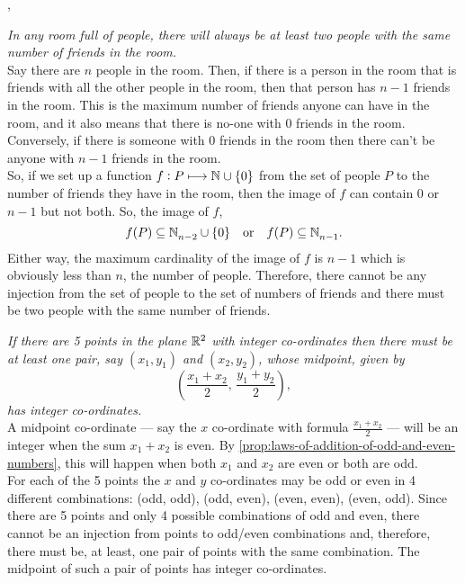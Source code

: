 \documentclass[../MathsNotesBase.tex]{subfiles}
\begin{document}
{		
		
		\sep
		\begin{exe}
			\ex \textit{In any room full of people, there will always be at least two people with the same number of friends in the room.}\\
			
			Say there are $n$ people in the room. Then, if there is a person in the room that is friends with all the other people in the room, then that person has ${ n - 1 }$ friends in the room. This is the maximum number of friends anyone can have in the room, and it also means that there is no-one with 0 friends in the room. Conversely, if there is someone with 0 friends in the room then there can't be anyone with ${ n - 1 }$ friends in the room.\\
			So, if we set up a function ${ f: P \longmapsto \mathbb{N}^{} \cup \{0\} }$ from the set of people $P$ to the number of friends they have in the room, then the image of $f$ can contain 0 or $n-1$ but not both. So, the image of $f$,
			\[ f(P) \subseteq \mathbb{N}^{}_{n-2} \cup \{0\} \hspace{10pt}\text{or}\hspace{10pt} f(P) \subseteq \mathbb{N}^{}_{n-1}. \]
			Either way, the maximum cardinality of the image of $f$ is ${ n - 1 }$ which is obviously less than $n$, the number of people. Therefore, there cannot be any injection from the set of people to the set of numbers of friends and there must be two people with the same number of friends.
			
			\ex \textit{If there are 5 points in the plane $\mathbb{R}^{2}$ with integer co-ordinates then there must be at least one pair, say $(x_1,y_1)$ and $(x_2,y_2)$, whose midpoint, given by
				\[ \left( \frac{x_1 + x_2}{2}, \, \frac{y_1 + y_2}{2} \right), \]
				has integer co-ordinates.}\\
			
			A midpoint co-ordinate --- say the $x$ co-ordinate with formula ${ \frac{x_1 + x_2}{2} }$ --- will be an integer when the sum ${ x_1 + x_2 }$ is even. By \autoref{prop:laws-of-addition-of-odd-and-even-numbers}, this will happen when both $x_1$ and $x_2$ are even or both are odd.\\
			For each of the 5 points the $x$ and $y$ co-ordinates may be odd or even in 4 different combinations: (odd, odd), (odd, even), (even, even), (even, odd). Since there are 5 points and only 4 possible combinations of odd and even, there cannot be an injection from points to odd/even combinations and, therefore, there must be, at least, one pair of points with the same combination. The midpoint of such a pair of points has integer co-ordinates.
			

\end{exe}}
\end{document}
